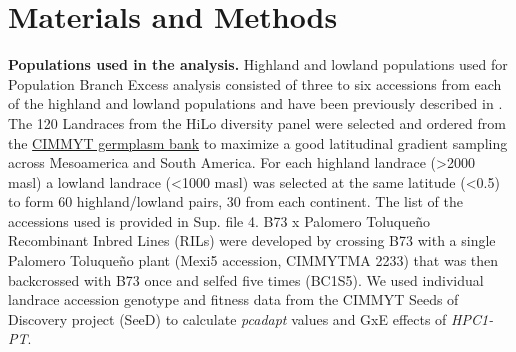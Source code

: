 \documentclass[9pt,twocolumn,twoside,lineno]{BioRxiv}
\begin{document}

\section{Materials and Methods}
\label{sec:materials:methods}
\textbf{Populations used in the analysis.} 
Highland and lowland populations used for Population Branch Excess analysis consisted of three to six accessions from each of the highland and lowland populations and have been previously described in \cite{Wang2020-mp, Wang2017-bc}. 
The 120 Landraces from the HiLo diversity panel were selected and ordered from the \href{http://mgb.cimmyt.org/gringlobal/search.aspx}{CIMMYT germplasm bank} to maximize a good latitudinal gradient sampling across Mesoamerica and South America. 
For each highland landrace (>2000 masl) a lowland landrace (<1000 masl) was selected at the same latitude (<0.5\degree) to form 60 highland/lowland pairs, 30 from each continent. 
The list of the accessions used is provided in Sup. file 4.   
B73 x Palomero Toluqueño Recombinant Inbred Lines (RILs) were developed by crossing B73 with a single Palomero Toluqueño plant (Mexi5 accession, CIMMYTMA 2233) that was then backcrossed with B73 once and selfed five times (BC1S5).  
We used  individual landrace accession genotype and fitness data from the CIMMYT Seeds of Discovery project (SeeD) \cite{Gates2019-xu} to calculate \textit{pcadapt} \cite{Luu2017-ws} values and GxE effects of \textit{HPC1-PT}.
\end{document}
